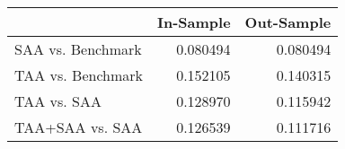 \begin{tabular}{lrr}
\toprule
{} &  In-Sample &  Out-Sample \\
\midrule
SAA vs. Benchmark &   0.080494 &    0.080494 \\
TAA vs. Benchmark &   0.152105 &    0.140315 \\
TAA vs. SAA       &   0.128970 &    0.115942 \\
TAA+SAA vs. SAA   &   0.126539 &    0.111716 \\
\bottomrule
\end{tabular}
